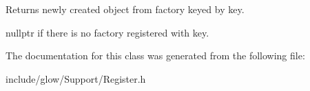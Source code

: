 \begin{DoxyReturn}{Returns}
newly created object from factory keyed by {\ttfamily key}. 

nullptr if there is no factory registered with {\ttfamily key}. 
\end{DoxyReturn}


The documentation for this class was generated from the following file\+:\begin{DoxyCompactItemize}
\item 
include/glow/\+Support/Register.\+h\end{DoxyCompactItemize}
